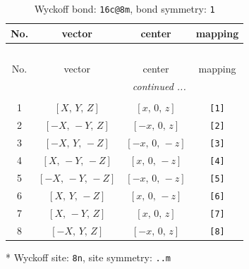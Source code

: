 \documentclass[fleqn,8pt]{jsarticle}
\begin{document}
\renewcommand{\arraystretch}{1.2}
\begin{longtable}{cccc}
\caption{Wyckoff bond: {\tt 16c@8m}, bond symmetry: {\tt 1}}
 \\
 \hline \hline
No. & vector & center & mapping \\ \hline \endfirsthead

\multicolumn{3}{l}{\tablename\ \thetable{}} \\
 \hline \hline
No. & vector & center & mapping \\ \hline \endhead

 \hline \hline
\multicolumn{3}{r}{\footnotesize\it continued ...} \\ \endfoot

 \hline \hline
\multicolumn{3}{r}{} \\ \endlastfoot

1 & $\left[ X,\, Y,\, Z \right]$ & $\left[ x,\, 0,\, z \right]$ & {\tt [1]} \\ \hline
2 & $\left[ - X,\, - Y,\, Z \right]$ & $\left[ - x,\, 0,\, z \right]$ & {\tt [2]} \\ \hline
3 & $\left[ - X,\, Y,\, - Z \right]$ & $\left[ - x,\, 0,\, - z \right]$ & {\tt [3]} \\ \hline
4 & $\left[ X,\, - Y,\, - Z \right]$ & $\left[ x,\, 0,\, - z \right]$ & {\tt [4]} \\ \hline
5 & $\left[ - X,\, - Y,\, - Z \right]$ & $\left[ - x,\, 0,\, - z \right]$ & {\tt [5]} \\ \hline
6 & $\left[ X,\, Y,\, - Z \right]$ & $\left[ x,\, 0,\, - z \right]$ & {\tt [6]} \\ \hline
7 & $\left[ X,\, - Y,\, Z \right]$ & $\left[ x,\, 0,\, z \right]$ & {\tt [7]} \\ \hline
8 & $\left[ - X,\, Y,\, Z \right]$ & $\left[ - x,\, 0,\, z \right]$ & {\tt [8]} \\
\end{longtable}
* Wyckoff site: {\tt 8n}, site symmetry: {\tt ..m}
\renewcommand{\arraystretch}{1.2}
\end{document}

